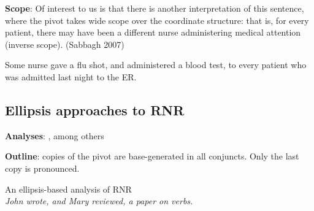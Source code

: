 \documentclass[paper=letter, fontsize=12pt]{scrartcl} %
\numberwithin{equation}{section} %
\numberwithin{figure}{section} %
\numberwithin{table}{section} %
\begin{document}
\begin{exe}
\ex\label{CSC-bad}
	\begin{xlista}
	\end{xlista}
\end{exe}

\textbf{Scope}: Of interest to us is that there is another interpretation of this sentence, where the pivot takes wide scope over the coordinate structure: that is, for every patient, there may have been a different nurse administering medical attention (inverse scope). (Sabbagh 2007)

\begin{exe}
\ex Some nurse gave a flu shot, and administered a blood test, to every patient who was admitted last night to the ER. 
\end{exe}



\subsection*{Ellipsis approaches to RNR}

\textbf{Analyses}: \citealt{Wexler:1980,Kayne:1994,Boskovic:2004,Ha:2008}, among others 

\textbf{Outline}: copies of the pivot are base-generated in all conjuncts. Only the last copy is pronounced.

\begin{exe}
\ex An ellipsis-based analysis of RNR \\ 
 \textit{John wrote, and Mary reviewed, a paper on verbs.} \\
\begin{tree}
\end{tree}
\end{exe}
\end{document}
